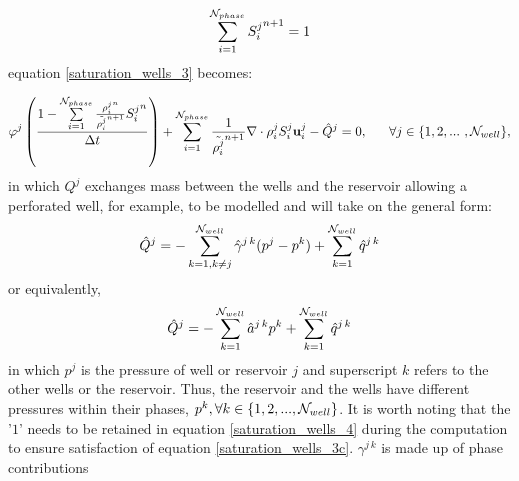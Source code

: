 \begin{equation}
\sum\limits_{i=1}^{{\cal N}_{phase}}
{S_i^{j}}^{n+1}
= 1
\label{saturation_wells_3c}
\end{equation}
equation
\ref{saturation_wells_3} becomes:

\begin{equation}
\phi^j
\left(  \frac{
1
-
\sum\limits_{i=1}^{{\cal N}_{phase}}
\frac{ {\rho_{i}^{j}}^{n} }
{  \tilde{\rho_{i}^{j}}^{n+1}  }
{S_i^{j}}^n
}
{\Delta t}
\right)
+
\sum\limits_{i=1}^{{\cal N}_{phase}}
\frac{1}{  \tilde{\rho_{i}^{j}}^{n+1}   }
\nabla\cdot\rho_{i}^{j}S_i^{j}\mathbf{u}_i^{j}
-\hat Q^j = 0,
~~~~~ \forall j \in\{ 1,2,...~ , {\cal N}_{well}\},
\label{saturation_wells_4}
\end{equation}
in which $Q^j$ exchanges mass between the
wells and the reservoir allowing a perforated well,
for example, to be modelled and will take on the general form:
\begin{equation}
\hat Q^j = - \sum_{k=1, k\neq j}^{{\cal N}_{well}}
\hat\gamma^{j \, k} (p^j - p^k)
+\sum_{k=1}^{{\cal N}_{well}}
\hat q^{j \, k}
\label{saturation_wells_5}
\end{equation}
or equivalently,
\begin{equation}
\hat Q^j = - \sum_{k=1}^{{\cal N}_{well}}
\hat a^{j \, k} p^k
+\sum_{k=1}^{{\cal N}_{well}}
\hat q^{j \, k}
\label{saturation_wells_5-a}
\end{equation}
in which $p^j$ is the pressure of well or reservoir $j$ and
superscript $k$ refers to the other wells or the reservoir.
Thus, the reservoir and the wells have different pressures within
their phases, $p^k, \forall k\in\{1,2,...,{\cal N}_{well}\}$. It is worth noting that the
'$1$' needs to be retained in equation \ref{saturation_wells_4} during the computation to
ensure satisfaction of equation \ref{saturation_wells_3c}.
$\gamma^{j\,k}$ is made up of phase contributions

